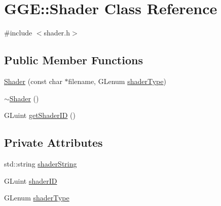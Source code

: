 \hypertarget{class_g_g_e_1_1_shader}{\section{G\+G\+E\+:\+:Shader Class Reference}
\label{class_g_g_e_1_1_shader}
}


{\ttfamily \#include $<$shader.\+h$>$}

\subsection*{Public Member Functions}
\begin{DoxyCompactItemize}
\item 
\hyperlink{class_g_g_e_1_1_shader_afb84a4ca449db00a0fcee2294968542d}{Shader} (const char $\ast$filename, G\+Lenum \hyperlink{class_g_g_e_1_1_shader_a26f6e14c6c17ad9272adfa507616f325}{shader\+Type})
\item 
\hyperlink{class_g_g_e_1_1_shader_a8dfaa9c632964ffb3a49bb11041efac3}{$\sim$\+Shader} ()
\item 
G\+Luint \hyperlink{class_g_g_e_1_1_shader_a9938d49d13cd8bfae14518bab7841290}{get\+Shader\+I\+D} ()
\end{DoxyCompactItemize}
\subsection*{Private Attributes}
\begin{DoxyCompactItemize}
\item 
std\+::string \hyperlink{class_g_g_e_1_1_shader_ad5e9d91f6cf959482b669d8fbf7712a4}{shader\+String}
\item 
G\+Luint \hyperlink{class_g_g_e_1_1_shader_a8ae56489b492426e188fecb1cc3eb679}{shader\+I\+D}
\item 
G\+Lenum \hyperlink{class_g_g_e_1_1_shader_a26f6e14c6c17ad9272adfa507616f325}{shader\+Type}
\end{DoxyCompactItemize}


